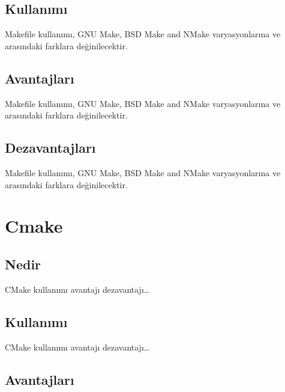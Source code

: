 \documentclass[
]{book}
\begin{document}
\hypertarget{kullanux131mux131}{%
\section*{Kullanımı}\label{kullanux131mux131}}

Makefile kullanımı, GNU Make, BSD Make and NMake varyasyonlarına ve arasındaki farklara değinilecektir.

\hypertarget{avantajlarux131}{%
\section*{Avantajları}\label{avantajlarux131}}

Makefile kullanımı, GNU Make, BSD Make and NMake varyasyonlarına ve arasındaki farklara değinilecektir.

\hypertarget{dezavantajlarux131}{%
\section*{Dezavantajları}\label{dezavantajlarux131}}

Makefile kullanımı, GNU Make, BSD Make and NMake varyasyonlarına ve arasındaki farklara değinilecektir.

\hypertarget{cmake}{%
\chapter*{Cmake}\label{cmake}}

\hypertarget{nedir-1}{%
\section*{Nedir}\label{nedir-1}}

CMake kullanımı avantajı dezavantajı\ldots{}

\hypertarget{kullanux131mux131-1}{%
\section*{Kullanımı}\label{kullanux131mux131-1}}

CMake kullanımı avantajı dezavantajı\ldots{}

\hypertarget{avantajlarux131-1}{%
\section*{Avantajları}\label{avantajlarux131-1}}
\end{document}
